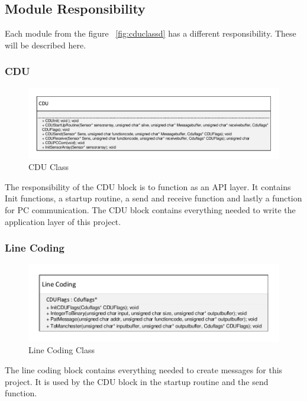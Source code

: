 \subsection{Module Responsibility}
Each module from the figure ~\ref{fig:cduclassd} has a different responsibility. These will be described here.
\subsubsection{CDU}
\begin{figure}[H]
\centering
\includegraphics[width = 1\textwidth]{billeder/CDUCDUClass}
\caption{CDU Class}
\label{fig:cduclass}
\end{figure}
The responsibility of the CDU block is to function as an API layer. It contains Init functions, a startup routine, a send and receive function and lastly a function for PC communication. The CDU block contains everything needed to write the application layer of this project.\\
\subsubsection{Line Coding}
\begin{figure}[H]
\centering
\includegraphics[scale=0.9]{billeder/CDULineCodingClass}
\caption{Line Coding Class}
\label{fig:cdulcclass}
\end{figure}
The line coding block contains everything needed to create messages for this project. It is used by the CDU block in the startup routine and the send function.

